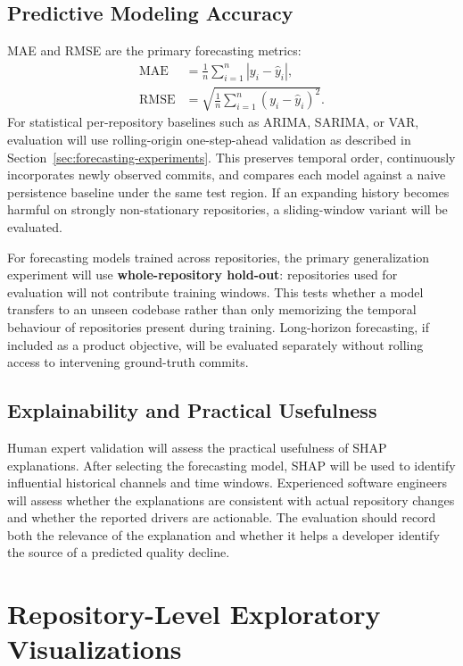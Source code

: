 \documentclass[12pt,a4paper,oneside]{report}
\begin{document}
\section{Predictive Modeling Accuracy}
MAE and RMSE are the primary forecasting metrics:
\begin{align}
\mathrm{MAE} &= \frac{1}{n}\sum_{i=1}^{n}|y_i-\hat y_i|,\\
\mathrm{RMSE} &= \sqrt{\frac{1}{n}\sum_{i=1}^{n}(y_i-\hat y_i)^2}.
\end{align}
For statistical per-repository baselines such as ARIMA, SARIMA, or VAR, evaluation will use rolling-origin one-step-ahead validation as described in Section~\ref{sec:forecasting-experiments}. This preserves temporal order, continuously incorporates newly observed commits, and compares each model against a naive persistence baseline under the same test region. If an expanding history becomes harmful on strongly non-stationary repositories, a sliding-window variant will be evaluated.

For forecasting models trained across repositories, the primary generalization experiment will use \textbf{whole-repository hold-out}: repositories used for evaluation will not contribute training windows. This tests whether a model transfers to an unseen codebase rather than only memorizing the temporal behaviour of repositories present during training. Long-horizon forecasting, if included as a product objective, will be evaluated separately without rolling access to intervening ground-truth commits.

\section{Explainability and Practical Usefulness}
Human expert validation will assess the practical usefulness of SHAP explanations. After selecting the forecasting model, SHAP will be used to identify influential historical channels and time windows. Experienced software engineers will assess whether the explanations are consistent with actual repository changes and whether the reported drivers are actionable. The evaluation should record both the relevance of the explanation and whether it helps a developer identify the source of a predicted quality decline.

\appendix
\chapter{Repository-Level Exploratory Visualizations}
\label{app:visuals}
\end{document}
